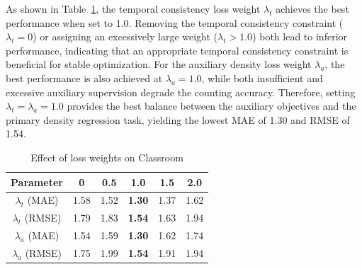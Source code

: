 \documentclass[lettersize,journal]{IEEEtran}
\begin{document}
As shown in Table~\ref{tab:6}, the temporal consistency loss weight $\lambda_t$ achieves the best performance when set to 1.0. Removing the temporal consistency constraint ($\lambda_t=0$) or assigning an excessively large weight ($\lambda_t>1.0$) both lead to inferior performance, indicating that an appropriate temporal consistency constraint is beneficial for stable optimization. For the auxiliary density loss weight $\lambda_a$, the best performance is also achieved at $\lambda_a=1.0$, while both insufficient and excessive auxiliary supervision degrade the counting accuracy. Therefore, setting $\lambda_t=\lambda_a=1.0$ provides the best balance between the auxiliary objectives and the primary density regression task, yielding the lowest MAE of 1.30 and RMSE of 1.54.


\begin{table}[h]
\centering
\caption{Effect of loss weights on Classroom}
\begin{tabular}{cccccc}
\toprule
Parameter & 0 & 0.5 & 1.0 & 1.5 & 2.0 \\
\midrule
$\lambda_t$ (MAE)  & 1.58 & 1.52 & \textbf{1.30} & 1.37 & 1.62 \\
$\lambda_t$ (RMSE) & 1.79 & 1.83 & \textbf{1.54} & 1.63 & 1.94 \\
\midrule
$\lambda_a$ (MAE)  & 1.54 & 1.59 & \textbf{1.30} & 1.62 & 1.74 \\
$\lambda_a$ (RMSE) & 1.75 & 1.99 & \textbf{1.54} & 1.91 & 1.94 \\
\bottomrule
\end{tabular}
\label{tab:6}
\end{table}
\end{document}
